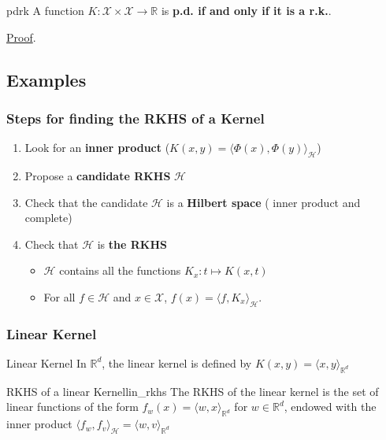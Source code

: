 \documentclass[10pt]{article}
\begin{document}
\begin{Theorem}{}{pdrk}
  A function $K : \mathcal{X} \times \mathcal{X} \rightarrow \mathbb{R}$ is 
  \textbf{p.d. if and only if it is a r.k.}.
  \par \hfill \hyperref[prf:pdrk]{\small Proof}.
\end{Theorem}



\subsection{Examples}

\subsubsection{Steps for finding the RKHS of a Kernel}
\begin{enumerate}
  \item Look for an \textbf{inner product} ($K(x, y) = \langle \Phi(x), \Phi(y)
  \rangle_\mathcal{H}$)
  \item Propose a \textbf{candidate RKHS} $\mathcal{H}$
  \item Check that the candidate $\mathcal{H}$ is a \textbf{Hilbert space} (
  inner product and complete)
  \item Check that $\mathcal{H}$ is \textbf{the RKHS}
  \begin{itemize}
    \item $\mathcal{H}$ contains all the functions $K_x : t \mapsto K(x,t)$
    \item For all $f \in \mathcal{H}$ and $x\in \mathcal{X}$, $f(x) = \langle
    f, K_x \rangle_\mathcal{H}$.
  \end{itemize}
\end{enumerate}

\subsubsection{Linear Kernel}

\begin{Definition}{Linear Kernel}{}
  In $\mathbb{R}^d$, the linear kernel is defined by $K(x, y) = \langle x, y 
  \rangle_{\mathbb{R}^d}$
\end{Definition}

\begin{Theorem}{RKHS of a linear Kernel}{lin_rkhs}
  The RKHS of the linear kernel is the set of linear functions of the form 
  $f_w(x) = \langle w,x \rangle_{\mathbb{R}^d}$ for $w \in \mathbb{R}^d$,
  endowed with the inner product $\langle f_w,f_v \rangle_\mathcal{H} = 
  \langle w,v \rangle_{\mathbb{R}^d}$
\end{Theorem}
\end{document}
